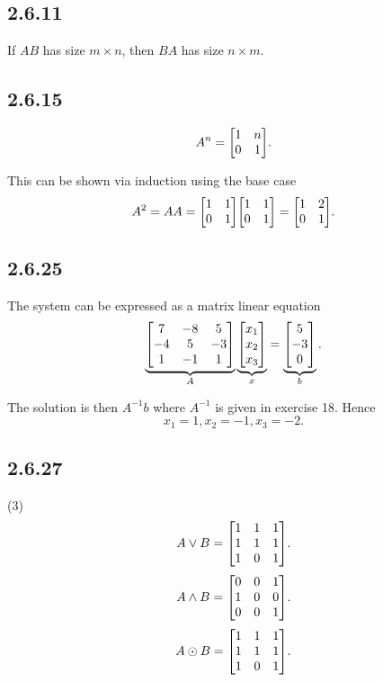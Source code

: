 \documentclass[12pt,titlepage]{extarticle}
\begin{document}
\subsection*{2.6.11}
If $AB$ has size $m \times n$, then $BA$ has size $n \times m$.

\subsection*{2.6.15}
\[
    A^n = \mqty[
    1 & n \\
    0 & 1 \\
    ]
.\]

This can be shown via induction using the base case
\[
    A^2  = AA = \mqty[
    1 & 1 \\
    0 & 1 \\
    ] \mqty[
    1 & 1 \\
    0 & 1 \\
    ] = \mqty[
    1 & 2 \\
    0 & 1 \\
    ]
.\]

\subsection*{2.6.25}
The system can be expressed as a matrix linear equation
\[
    \underbrace{\mqty[
    7 & -8 & 5 \\
    -4 & 5 & -3 \\
    1 & -1 & 1
    ]}_A 
    \underbrace{\mqty[
    x_1 \\
    x_2 \\
    x_3
    ]}_x =
    \underbrace{\mqty[
    5 \\
    -3 \\
    0
    ]}_b
.\]

The solution is then $A^{-1} b$ where $A^{-1}$ is given in exercise 18. Hence
\[
    x_1 = 1, x_2 = -1, x_3 = -2
.\]

\subsection*{2.6.27}
\begin{tasks}(3)
    \task
    \[
        A \lor B = \mqty[
        1 & 1 & 1 \\
        1 & 1 & 1 \\
        1 & 0 & 1 \\
        ]
    .\]
    \task
    \[
        A \land B = \mqty[
        0 & 0 & 1 \\
        1 & 0 & 0 \\
        0 & 0 & 1 \\
        ]
    .\]
    \task
    \[
        A \odot B = \mqty[
        1 & 1 & 1 \\
        1 & 1 & 1 \\
        1 & 0 & 1 \\
        ]
    .\]
\end{tasks}
\end{document}
